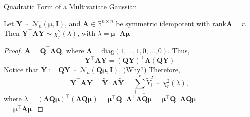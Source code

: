 \documentclass{beamer}
\newcommand{\rank}{\mathrm{rank}}
\begin{document}
\begin{frame}{Quadratic Form of a Multivariate Gaussian}
\begin{theorem}
Let $\mathbf{Y}\sim\mathcal{N}_n(\boldsymbol\mu,\mathbf{I})$, and $\mathbf{A}\in\mathbb{R}^{n\times n}$ be symmetric idempotent with $\rank\mathbf{A}=r$. Then
$\mathbf{Y}^\top\mathbf{A}\mathbf{Y}\sim\chi^2_r(\lambda)$, with $\lambda=\boldsymbol\mu^\top\mathbf{A}\boldsymbol\mu$
\end{theorem}
\begin{proof}
\pause $\mathbf{A}=\mathbf{Q}^\top\boldsymbol\Lambda\mathbf{Q}$, where $\boldsymbol\Lambda=\mathrm{diag}(1,\ldots,1,0,\ldots,0)$. \pause Thus,
$$
\mathbf{Y}^\top\mathbf{AY}=(\mathbf{QY})^\top\boldsymbol\Lambda(\mathbf{QY})
$$
\pause Notice that $\tilde{\mathbf{Y}}:=\mathbf{QY}\sim\mathcal{N}_n(\mathbf{Q}\boldsymbol\mu,\mathbf{I})$. (Why?) \pause Therefore,
$$
\mathbf{Y}^\top\mathbf{AY}=\tilde{\mathbf{Y}}^\top\boldsymbol\Lambda\tilde{\mathbf{Y}}=\sum_{i=1}^r\tilde{Y}_i^2\sim\chi^2_r(\lambda),
$$
\pause where $\lambda=(\boldsymbol\Lambda\mathbf{Q}\boldsymbol\mu)^\top(\boldsymbol\Lambda\mathbf{Q}\boldsymbol\mu)=\boldsymbol\mu^\top\mathbf{Q}^\top\boldsymbol\Lambda^\top\boldsymbol\Lambda\mathbf{Q}\boldsymbol\mu=\boldsymbol\mu^\top\mathbf{Q}^\top\boldsymbol\Lambda\mathbf{Q}\boldsymbol\mu$\\
$=\boldsymbol\mu^\top\mathbf{A}\boldsymbol\mu$.
\end{proof}
\end{frame}
\end{document}
